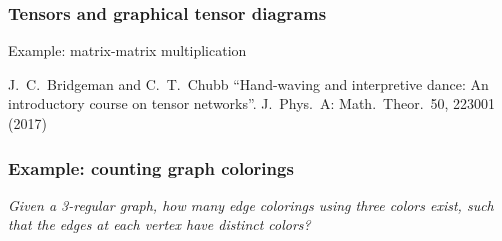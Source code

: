 \documentclass[t]{beamer}
\begin{document}
\begin{frame}
\frametitle{Tensors and graphical tensor diagrams}
\vspace{8cm}

Example: matrix-matrix multiplication

\vspace{4.5cm}

\footnotesize{%
{J.~C.~Bridgeman and C.~T.~Chubb} ``Hand-waving and interpretive dance: An introductory course on tensor networks''. J.~Phys.~A: Math.~Theor.~50, 223001 (2017)\nocite{BridgemanChubb2017}%
}
\end{frame}



\begin{frame}
\frametitle{Example: counting graph colorings}
\emph{Given a 3-regular graph, how many edge colorings using three colors exist, such that the edges at each vertex have distinct colors?}


\end{frame}
\end{document}

